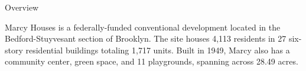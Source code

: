 Overview

Marcy Houses is a federally-funded conventional development located in the Bedford-Stuyvesant section of Brooklyn. The site houses 4,113 residents in 27 six-story residential buildings totaling 1,717 units. Built in 1949, Marcy also has a community center, green space, and 11 playgrounds, spanning across 28.49 acres. 